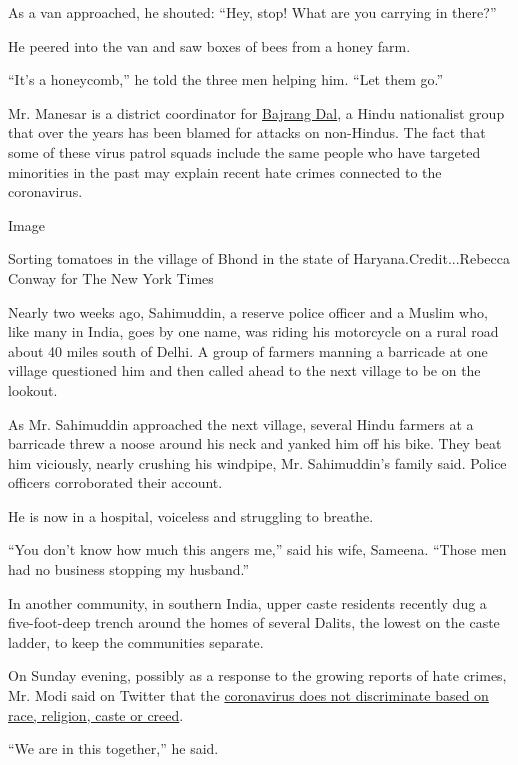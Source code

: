 As a van approached, he shouted: ``Hey, stop! What are you carrying in
there?''

He peered into the van and saw boxes of bees from a honey farm.

``It's a honeycomb,'' he told the three men helping him. ``Let them
go.''

Mr. Manesar is a district coordinator for
\href{https://www.news18.com/news/india/bulandshahr-violence-bajrang-dal-leader-who-complained-of-cow-slaughter-arrested-for-cops-murder-bjp-and-vhp-men-other-accused-1959599.html}{Bajrang
Dal}, a Hindu nationalist group that over the years has been blamed for
attacks on non-Hindus. The fact that some of these virus patrol squads
include the same people who have targeted minorities in the past may
explain recent hate crimes connected to the coronavirus.

Image

Sorting tomatoes in the village of Bhond in the state of
Haryana.Credit...Rebecca Conway for The New York Times

Nearly two weeks ago, Sahimuddin, a reserve police officer and a Muslim
who, like many in India, goes by one name, was riding his motorcycle on
a rural road about 40 miles south of Delhi. A group of farmers manning a
barricade at one village questioned him and then called ahead to the
next village to be on the lookout.

As Mr. Sahimuddin approached the next village, several Hindu farmers at
a barricade threw a noose around his neck and yanked him off his bike.
They beat him viciously, nearly crushing his windpipe, Mr. Sahimuddin's
family said. Police officers corroborated their account.

He is now in a hospital, voiceless and struggling to breathe.

``You don't know how much this angers me,'' said his wife, Sameena.
``Those men had no business stopping my husband.''

In another community, in southern India, upper caste residents recently
dug a five-foot-deep trench around the homes of several Dalits, the
lowest on the caste ladder, to keep the communities separate.

On Sunday evening, possibly as a response to the growing reports of hate
crimes, Mr. Modi said on Twitter that the
\href{https://twitter.com/PMOIndia/status/1251839308085915649}{coronavirus
does not discriminate based on race, religion, caste or creed}.

``We are in this together,'' he said.

